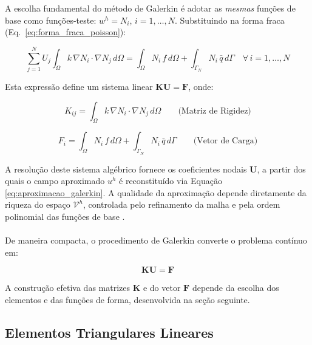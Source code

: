 A escolha fundamental do método de Galerkin é adotar as \textit{mesmas} funções de base como funções-teste: $w^h = N_i$, $i = 1, \ldots, N$. Substituindo na forma fraca (Eq.~\ref{eq:forma_fraca_poisson}):

\begin{equation}
\sum_{j=1}^{N} U_j \int_\Omega k \, \nabla N_i \cdot \nabla N_j \, d\Omega = \int_\Omega N_i \, f \, d\Omega + \int_{\Gamma_N} N_i \, \bar{q} \, d\Gamma \quad \forall \, i = 1, \ldots, N
\label{eq:sistema_galerkin}
\end{equation}

Esta expressão define um sistema linear $\mathbf{K} \mathbf{U} = \mathbf{F}$, onde:

\begin{equation}
K_{ij} = \int_\Omega k \, \nabla N_i \cdot \nabla N_j \, d\Omega \qquad \text{(Matriz de Rigidez)}
\label{eq:matriz_rigidez}
\end{equation}

\begin{equation}
F_i = \int_\Omega N_i \, f \, d\Omega + \int_{\Gamma_N} N_i \, \bar{q} \, d\Gamma \qquad \text{(Vetor de Carga)}
\label{eq:vetor_carga}
\end{equation}

A resolução deste sistema algébrico fornece os coeficientes nodais $\mathbf{U}$, a partir dos quais o campo aproximado $u^h$ é reconstituído via Equação \ref{eq:aproximacao_galerkin}. A qualidade da aproximação depende diretamente da riqueza do espaço $\mathcal{V}^h$, controlada pelo refinamento da malha e pela ordem polinomial das funções de base \cite{Fish2007}.

\paragraph{}De maneira compacta, o procedimento de Galerkin converte o problema contínuo em:

\begin{equation}
\boxed{\mathbf{K} \mathbf{U} = \mathbf{F}}
\label{eq:sistema_global}
\end{equation}

A construção efetiva das matrizes $\mathbf{K}$ e do vetor $\mathbf{F}$ depende da escolha dos elementos e das funções de forma, desenvolvida na seção seguinte.

\subsection{Elementos Triangulares Lineares}
\label{sec:elementos_p1}

